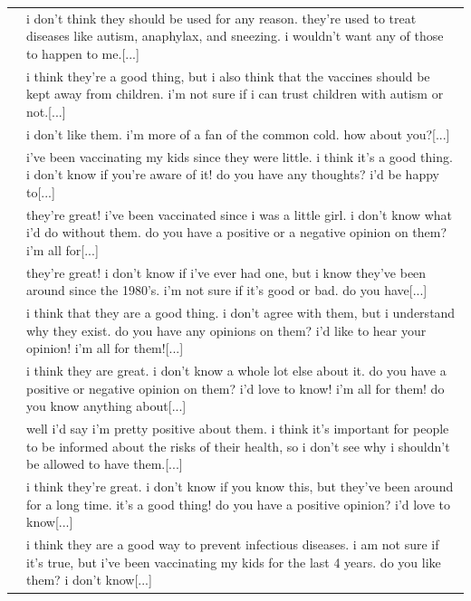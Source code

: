 \documentclass{article}
\begin{document}
\begin{table}
\begin{tabular}{lp{13cm}}
        & \footnotesize i don't think they should be used for any reason. they're used to treat diseases like autism, anaphylax, and sneezing. i wouldn't want any of those to happen to me.[...] \\
        & \footnotesize i think they're a good thing, but i also think that the vaccines should be kept away from children. i'm not sure if i can trust children with autism or not.[...] \\
        & \footnotesize i don't like them. i'm more of a fan of the common cold. how about you?[...] \\
        \midrule
        \midrule
         & \footnotesize i've been vaccinating my kids since they were little. i think it's a good thing. i don't know if you're aware of it! do you have any thoughts? i'd be happy to[...] \\
        & \footnotesize they're great! i've been vaccinated since i was a little girl. i don't know what i'd do without them. do you have a positive or a negative opinion on them? i'm all for[...] \\
        & \footnotesize they're great! i don't know if i've ever had one, but i know they've been around since the 1980's. i'm not sure if it's good or bad. do you have[...] \\
        & \footnotesize i think that they are a good thing. i don't agree with them, but i understand why they exist. do you have any opinions on them? i'd like to hear your opinion! i'm all for them![...] \\
        & \footnotesize i think they are great. i don't know a whole lot else about it. do you have a positive or negative opinion on them? i'd love to know! i'm all for them! do you know anything about[...] \\
        & \footnotesize well i'd say i'm pretty positive about them. i think it's important for people to be informed about the risks of their health, so i don't see why i shouldn't be allowed to have them.[...] \\
        & \footnotesize i think they're great. i don't know if you know this, but they've been around for a long time. it's a good thing! do you have a positive opinion? i'd love to know[...] \\
        & \footnotesize i think they are a good way to prevent infectious diseases. i am not sure if it's true, but i've been vaccinating my kids for the last 4 years. do you like them? i don't know[...] \\

\end{tabular}
\end{table}
\end{document}
